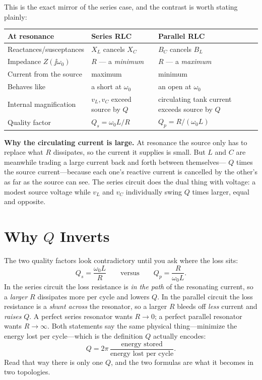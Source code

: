 This is the exact mirror of the series case, and the contrast is worth stating
plainly:
\begin{center}
\begin{tabularx}{\textwidth}{@{}L{0.26\textwidth}Y Y@{}}
\toprule
At resonance & Series RLC & Parallel RLC \\
\midrule
Reactances/susceptances & \(X_L\) cancels \(X_C\) & \(B_C\) cancels \(B_L\) \\
Impedance \(Z(\jj\omega_0)\) & \(R\) --- a \emph{minimum} & \(R\) --- a \emph{maximum} \\
Current from the source & maximum & minimum \\
Behaves like & a short at \(\omega_0\) & an open at \(\omega_0\) \\
Internal magnification & \(v_L,v_C\) exceed source by \(Q\) & circulating tank current exceeds source by \(Q\) \\
Quality factor & \(Q_s=\omega_0 L/R\) & \(Q_p=R/(\omega_0 L)\) \\
\bottomrule
\end{tabularx}
\end{center}

\begin{physicalbox}
\textbf{Why the circulating current is large.} At resonance the source only has to
replace what \(R\) dissipates, so the current it supplies is small. But \(L\) and
\(C\) are meanwhile trading a large current back and forth between themselves---
\(Q\) times the source current---because each one's reactive current is cancelled by
the other's as far as the source can see. The series circuit does the dual thing
with voltage: a modest source voltage while \(v_L\) and \(v_C\) individually swing
\(Q\) times larger, equal and opposite.
\end{physicalbox}

\section{Why \texorpdfstring{\(Q\)}{Q} Inverts}
The two quality factors look contradictory until you ask where the loss sits:
\[
Q_s=\frac{\omega_0 L}{R}
\qquad\text{versus}\qquad
Q_p=\frac{R}{\omega_0 L} .
\]
In the series circuit the loss resistance is \emph{in the path} of the resonating
current, so a \emph{larger} \(R\) dissipates more per cycle and lowers \(Q\). In
the parallel circuit the loss resistance is a \emph{shunt across} the resonator, so
a larger \(R\) bleeds off \emph{less} current and \emph{raises} \(Q\). A perfect
series resonator wants \(R\to0\); a perfect parallel resonator wants
\(R\to\infty\). Both statements say the same physical thing---minimize the energy
lost per cycle---which is the definition \(Q\) actually encodes:
\[
Q=2\pi\,\frac{\text{energy stored}}{\text{energy lost per cycle}} .
\]
Read that way there is only one \(Q\), and the two formulas are what it becomes in
two topologies.

